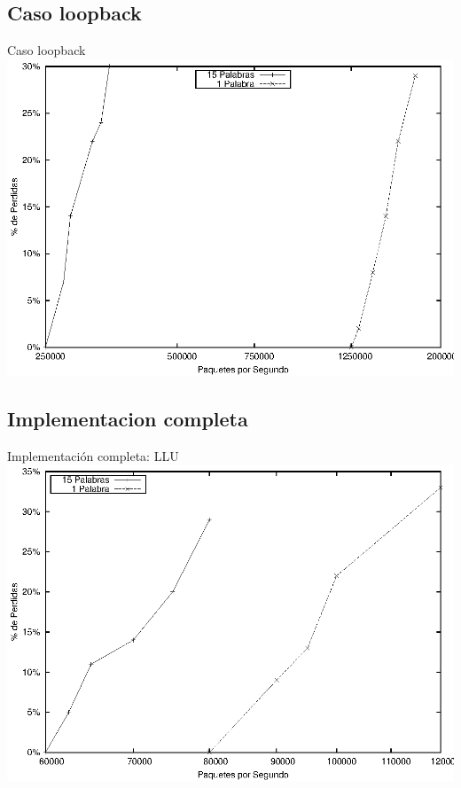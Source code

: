 \documentclass[xcolor=dvipsnames]{beamer}
\begin{document}
\subsection{Caso loopback}
\begin{frame}{Caso loopback} 
\center	
\includegraphics[scale=0.70]{figures/loop.eps} 
\end{frame}

\subsection{Implementacion completa}
\begin{frame}{Implementación completa: LLU} 
\center	
\includegraphics[scale=0.70]{figures/llumin.eps} 
\end{frame}
\end{document}
